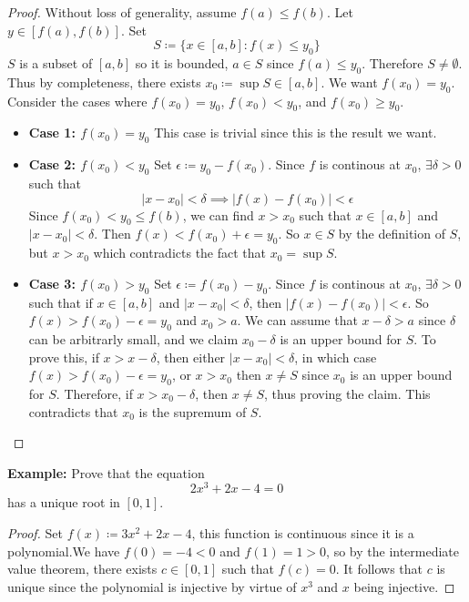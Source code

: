 \documentclass[openany]{report}
\begin{document}
\begin{proof}
    Without loss of generality, assume $f(a) \leq f(b)$. Let $y \in [f(a), f(b)]$. Set 
    \[S \coloneqq \{x \in [a,b]: f(x) \leq y_0\}\]
    $S$ is a subset of $[a,b]$ so it is bounded, $a \in S$ since $f(a) \leq y_0$. Therefore $S \neq \emptyset$. Thus by completeness, there exists $x_0 \coloneqq \sup S \in [a,b]$. We want $f(x_0) = y_0$. Consider the cases where $f(x_0) = y_0$, $f(x_0) < y_0$, and $f(x_0) \geq y_0$.
    \begin{itemize}
        \item \textbf{Case 1: $f(x_0) = y_0$} This case is trivial since this is the result we want. 
        \item \textbf{Case 2: $f(x_0) < y_0$} Set $\epsilon \coloneqq y_0 - f(x_0)$. Since $f$ is continous at $x_0$, $\exists \delta > 0$ such that 
        \[|x - x_0| < \delta \implies |f(x) - f(x_0)| < \epsilon\]
        Since $f(x_0) < y_0 \leq f(b)$, we can find $x > x_0$ such that $x \in [a,b]$ and $|x-x_0| < \delta$. Then $f(x) < f(x_0) + \epsilon = y_0$. So $x \in S$ by the definition of $S$, but $x > x_0$ which contradicts the fact that $x_0 = \sup S$.
        \item \textbf{Case 3: $f(x_0) > y_0$} Set $\epsilon \coloneqq f(x_0) - y_0$. Since $f$ is continous at $x_0$, $\exists \delta > 0$ such that if $x \in [a,b]$ and $|x-x_0| < \delta$, then $|f(x) - f(x_0)| < \epsilon$. So $f(x) > f(x_0) - \epsilon = y_0$ and $x_0 > a$. We can assume that $x - \delta > a$ since $\delta$ can be arbitrarly small, and we claim $x_0 - \delta$ is an upper bound for $S$. To prove this, if $x > x - \delta$, then either $|x - x_0| < \delta$, in which case $f(x) > f(x_0) - \epsilon = y_0$, or $x > x_0$ then $x \neq S$ since $x_0$ is an upper bound for $S$. Therefore, if $x >  x_0 - \delta$, then $x \neq S$, thus proving the claim. This contradicts that $x_0$ is the supremum of $S$.  
    \end{itemize}
\end{proof}
\noindent
\textbf{Example:} Prove that the equation 
\[2x^3 + 2x - 4 = 0\]
has a unique root in $[0,1]$.
\begin{proof}
    Set $f(x) \coloneqq 3x^2 + 2x - 4$, this function is continuous since it is a polynomial.We have $f(0) = -4 < 0$ and $f(1) = 1 > 0$, so by the intermediate value theorem, there exists $c \in [0,1]$ such that $f(c) = 0$. It follows that $c$ is unique since the polynomial is injective by virtue of $x^3$ and $x$ being injective. 
\end{proof}
\end{document}
